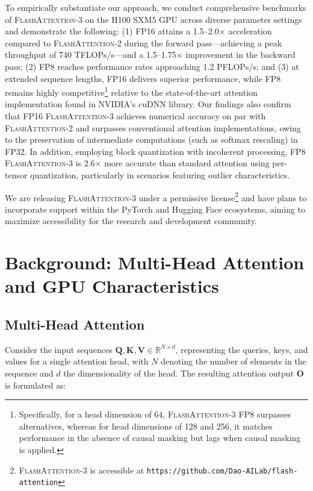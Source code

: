 To empirically substantiate our approach, we conduct comprehensive benchmarks of \textsc{FlashAttention-3} on the H100 SXM5 GPU across diverse parameter settings and demonstrate the following: (1) FP16 attains a 1.5–2.0$\times$ acceleration compared to \textsc{FlashAttention-2} during the forward pass—achieving a peak throughput of 740 TFLOPs/s—and a 1.5–1.75$\times$ improvement in the backward pass; (2) FP8 reaches performance rates approaching 1.2 PFLOPs/s; and (3) at extended sequence lengths, FP16 delivers superior performance, while FP8 remains highly competitive\footnote{Specifically, for a head dimension of 64, \textsc{FlashAttention-3} FP8 surpasses alternatives, whereas for head dimensions of 128 and 256, it matches performance in the absence of causal masking but lags when causal masking is applied.} relative to the state-of-the-art attention implementation found in NVIDIA’s cuDNN library. Our findings also confirm that FP16 \textsc{FlashAttention-3} achieves numerical accuracy on par with \textsc{FlashAttention-2} and surpasses conventional attention implementations, owing to the preservation of intermediate computations (such as softmax rescaling) in FP32. In addition, employing block quantization with incoherent processing, FP8 \textsc{FlashAttention-3} is 2.6$\times$ more accurate than standard attention using per-tensor quantization, particularly in scenarios featuring outlier characteristics.

We are releasing \textsc{FlashAttention-3} under a permissive license\footnote{\textsc{FlashAttention-3} is accessible at \texttt{https://github.com/Dao-AILab/flash-attention}} and have plans to incorporate support within the PyTorch and Hugging Face ecosystems, aiming to maximize accessibility for the research and development community.

\section{Background: Multi-Head Attention and GPU Characteristics}
\label{sec:background}

\subsection{Multi-Head Attention}
\label{subsec:multi_head_attn}

Consider the input sequences $\mathbf{Q}, \mathbf{K}, \mathbf{V} \in \mathbb{R}^{N \times d}$, representing the queries, keys, and values for a single attention head, with $N$ denoting the number of elements in the sequence and $d$ the dimensionality of the head. The resulting attention output $\mathbf{O}$ is formulated as:

